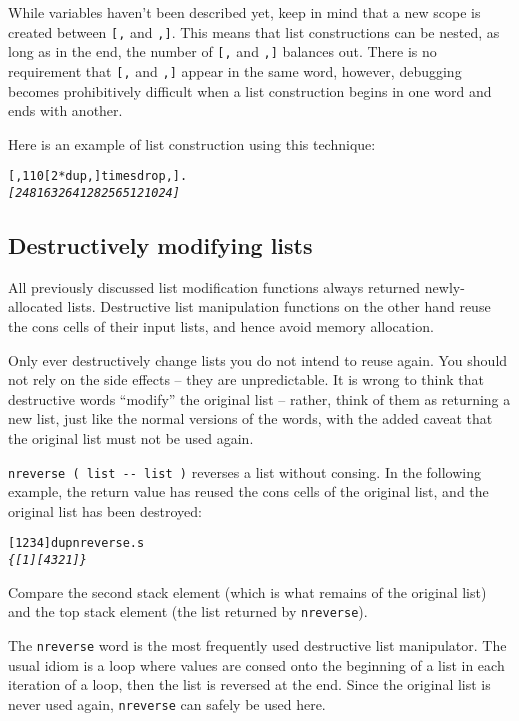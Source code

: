 \documentclass[english]{article}
\begin{document}
While variables haven't been described yet, keep in mind that a new
scope is created between \texttt{{[},} and \texttt{,{]}}. This means
that list constructions can be nested, as long as in the end, the
number of \texttt{{[},} and \texttt{,{]}} balances out. There is no
requirement that \texttt{{[},} and \texttt{,{]}} appear in the same
word, however, debugging becomes prohibitively difficult when a list
construction begins in one word and ends with another.

Here is an example of list construction using this technique:

\begin{alltt}
{[}, 1 10 {[} 2 {*} dup , {]} times drop ,{]} .
\emph{{[} 2 4 8 16 32 64 128 256 512 1024 {]}}
\end{alltt}

\subsection{\label{sub:Destructively-modifying-lists}Destructively modifying lists}

All previously discussed list modification functions always returned
newly-allocated lists. Destructive list manipulation functions on
the other hand reuse the cons cells of their input lists, and hence
avoid memory allocation.

Only ever destructively change lists you do not intend to reuse again.
You should not rely on the side effects -- they are unpredictable.
It is wrong to think that destructive words {}``modify'' the original
list -- rather, think of them as returning a new list, just like the
normal versions of the words, with the added caveat that the original
list must not be used again.

\texttt{nreverse ( list -{}- list )} reverses a list without consing.
In the following example, the return value has reused the cons cells of
the original list, and the original list has been destroyed:

\begin{alltt}
{[} 1 2 3 4 {]} dup nreverse .s
\emph{\{ {[} 1 {]} {[} 4 3 2 1 {]} \}}
\end{alltt}
Compare the second stack element (which is what remains of the original
list) and the top stack element (the list returned by \texttt{nreverse}).

The \texttt{nreverse} word is the most frequently used destructive
list manipulator. The usual idiom is a loop where values are consed
onto the beginning of a list in each iteration of a loop, then the
list is reversed at the end. Since the original list is never used
again, \texttt{nreverse} can safely be used here.
\end{document}
